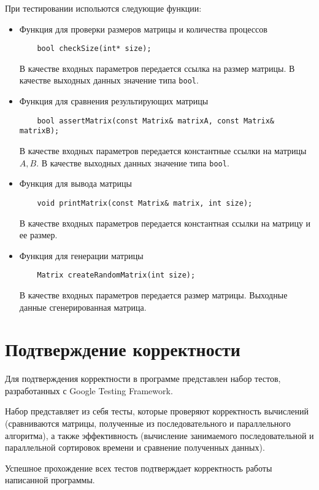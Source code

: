 \documentclass{report}
\begin{document}
\par При тестировании испольются следующие функции:
\begin{itemize}
    \item Функция для проверки размеров матрицы и количества процессов
    \begin{lstlisting}
    bool checkSize(int* size);
    \end{lstlisting}
    \par В качестве входных параметров передается ссылка на размер матрицы. В качестве выходных данных значение типа \verb|bool|.
    \item Функция для сравнения результирующих матрицы
    \begin{lstlisting}
    bool assertMatrix(const Matrix& matrixA, const Matrix& matrixB);
    \end{lstlisting}
    \par В качестве входных параметров передается константные ссылки на матрицы {\itshape $A, B$}. В качестве выходных данных значение типа \verb|bool|.
    \item Функция для вывода матрицы
    \begin{lstlisting}
    void printMatrix(const Matrix& matrix, int size);
    \end{lstlisting}
    \par В качестве входных параметров передается константная ссылки на матрицу и ее размер.
    \item Функция для генерации матрицы
    \begin{lstlisting}
    Matrix createRandomMatrix(int size);
    \end{lstlisting}
    \par В качестве входных параметров передается размер матрицы. Выходные данные сгенерированная матрица.
\end{itemize}
\newpage

\section*{Подтверждение корректности}
Для подтверждения корректности в программе представлен набор тестов, разработанных с Google Testing Framework.
\par Набор представляет из себя тесты, которые проверяют корректность вычислений (сравниваются матрицы, полученные из последовательного и параллельного алгоритма), а также эффективность (вычисление занимаемого последовательной и параллельной сортировок времени и сравнение полученных данных).
\par Успешное прохождение всех тестов подтверждает корректность работы написанной программы.
\newpage
\end{document}
